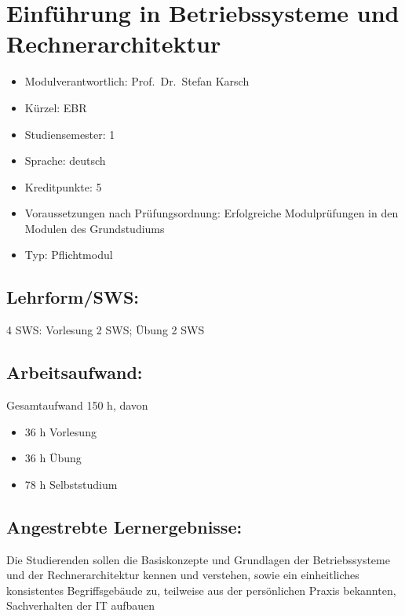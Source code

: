 \chapter{Einführung in Betriebssysteme und
Rechnerarchitektur}\label{einfuxfchrung-in-betriebssysteme-und-rechnerarchitektur}

\begin{itemize}
\tightlist
\item
  Modulverantwortlich: Prof.~Dr.~Stefan Karsch
\item
  Kürzel: EBR
\item
  Studiensemester: 1
\item
  Sprache: deutsch
\item
  Kreditpunkte: 5
\item
  Voraussetzungen nach Prüfungsordnung: Erfolgreiche Modulprüfungen in
  den Modulen des Grundstudiums
\item
  Typ: Pflichtmodul
\end{itemize}

\section*{Lehrform/SWS:}\label{lehrformsws-8}

4 SWS: Vorlesung 2 SWS; Übung 2 SWS

\section*{Arbeitsaufwand:}\label{arbeitsaufwand-8}

Gesamtaufwand 150 h, davon

\begin{itemize}
\tightlist
\item
  36 h Vorlesung
\item
  36 h Übung
\item
  78 h Selbststudium
\end{itemize}

\section*{Angestrebte
Lernergebnisse:}\label{angestrebte-lernergebnisse-8}

Die Studierenden sollen die Basiskonzepte und Grundlagen der
Betriebssysteme und der Rechnerarchitektur kennen und verstehen, sowie
ein einheitliches konsistentes Begriffsgebäude zu, teilweise aus der
persönlichen Praxis bekannten, Sachverhalten der IT aufbauen

